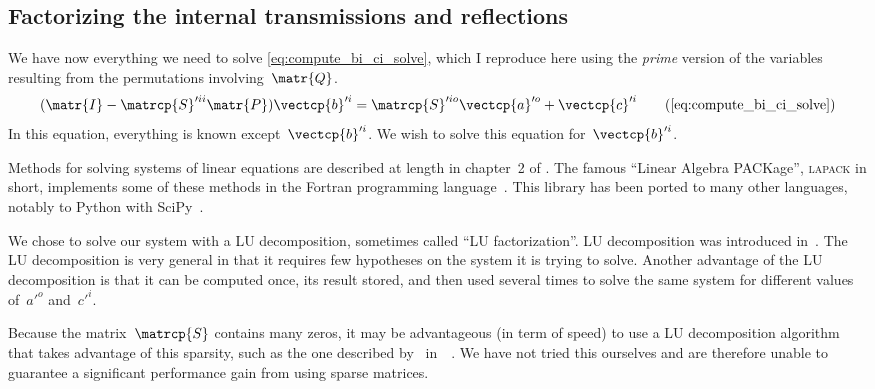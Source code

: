 \begin{refsection}

\subsection{Factorizing the internal transmissions and reflections}

We have now everything we need to solve \cref{eq:compute_bi_ci_solve}, which I reproduce here using the \textit{prime} version of the variables resulting from the permutations involving~$\matr{Q}$.
\begin{equation}
    (\matr{I} - \matrcp{S}'^{ii}\matr{P})\vectcp{b}'^i =
    \matrcp{S}'^{io} \vectcp{a}'^o + \vectcp{c}'^i
    \tag{\ref{eq:compute_bi_ci_solve}}
\end{equation}
In this equation, everything is known except~$\vectcp{b}'^i$.
We wish to solve this equation for~$\vectcp{b}'^i$.

Methods for solving systems of linear equations are described at length in chapter~2 of \textcite{Press:2007:NRE:1403886}.
The famous ``Linear Algebra PACKage'', \textsc{lapack} in short, implements some of these methods in the Fortran programming language~\parencite{lapack}.
This library has been ported to many other languages, notably to Python with SciPy~\parencite{scipy}.

We chose to solve our system with a LU decomposition, sometimes called ``LU factorization''.
LU decomposition was introduced in~\textcite{turing1948rounding}.
The LU decomposition is very general in that it requires few hypotheses on the system it is trying to solve.
Another advantage of the LU decomposition is that it can be computed once, its result stored, and then used several times to solve the same system for different values of~$a'^o$ and~$c'^i$.

Because the matrix~$\matrcp{S}$ contains many zeros, it may be advantageous (in term of speed) to use a LU decomposition algorithm that takes advantage of this sparsity, such as the one described by~\citeauthor{dongarra2001recursive} in~~\cite{dongarra2001recursive}.
We have not tried this ourselves and are therefore unable to guarantee a significant performance gain from using sparse matrices.


\end{refsection}
